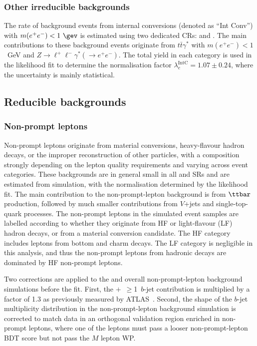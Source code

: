 \documentclass[cernpreprint, atlasdraft=false, texlive=2023, UKenglish, texmf, orcidlogo]{atlasdoc}
\begin{document}
\subsubsection{Other irreducible backgrounds}
\label{sec:other_irreducible_backgrounds}
 
The rate of background events from internal conversions (denoted as ``Int Conv'') with $m(e^+e^-)<1~\gev$ is estimated using two dedicated CRs: \lllintc and \lllmatc.
The main contributions to these background events originate from $t\bar{t}\gamma^\ast$ with $m(e^{+}e^{-}) < 1$~GeV and $Z \to \ell^{+}\ell^{-}\gamma^*(\to e^{+}e^{-})$.
The total yield in each category is used in the likelihood fit to determine the normalisation factor $\lambda^\textrm{IntC}_e = 1.07 \pm 0.24$, where the uncertainty is mainly statistical.
 
 
\subsection{Reducible backgrounds}
\label{sec:bkg_reducible}
 
\subsubsection{Non-prompt leptons}
\label{sec:bkg_reducible_nonprompt}
 
Non-prompt leptons originate from material conversions, heavy-flavour
hadron decays, or the improper reconstruction of other particles, with
a composition strongly depending on the lepton quality requirements
and varying across event categories. These backgrounds are in general
small in all \ll and \lll SRs and are estimated from simulation,
with the normalisation determined by the likelihood fit. The main
contribution to the non-prompt-lepton background is from $\ttbar$
production, followed by much smaller contributions from $V$+jets and
single-top-quark processes. The non-prompt leptons in the simulated event
samples are labelled according to whether they originate from HF or
light-flavour (LF) hadron decays, or from a material conversion
candidate. The HF category includes leptons from bottom and charm
decays. The LF category is negligible in this analysis, and thus the
non-prompt leptons from hadronic decays are dominated by HF non-prompt
leptons.
 
Two corrections are applied to the \ttbar and overall non-prompt-lepton background
simulations before the fit. First, the \ttbar$+$~$\geq${}1~$b$-jet contribution
is multiplied by a factor of 1.3 as previously measured by ATLAS~\cite{HIGG-2020-23}.
Second, the shape of the
$b$-jet multiplicity distribution in the non-prompt-lepton background simulation is
corrected to match data in an orthogonal \llSS validation region
enriched in non-prompt leptons, where one of the leptons must pass a
looser non-prompt-lepton BDT score but not pass the $M$ lepton WP.
 
\end{document}
